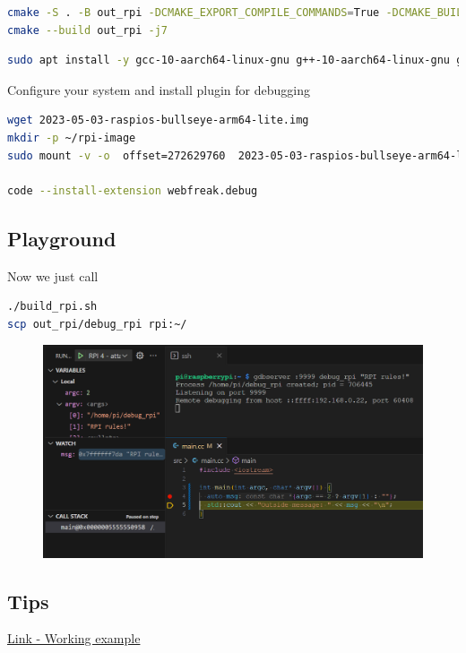 \documentclass[twocolumn, 10pt]{article}
\makeatletter
\newcommand{\fsize}{\f@size pt }
\makeatother
\begin{document}
  
\begin{lstlisting}[language=sh,breaklines=true,caption={build_rpi.sh}]
cmake -S . -B out_rpi -DCMAKE_EXPORT_COMPILE_COMMANDS=True -DCMAKE_BUILD_TYPE=Debug --toolchain rpi4.toolchain.cmake
cmake --build out_rpi -j7
\end{lstlisting}

\begin{lstlisting}[language=sh]
sudo apt install -y gcc-10-aarch64-linux-gnu g++-10-aarch64-linux-gnu gdb-multiarch clangd
\end{lstlisting}

Configure your system and install plugin for debugging
\begin{lstlisting}[language=sh,breaklines=true]
wget 2023-05-03-raspios-bullseye-arm64-lite.img
mkdir -p ~/rpi-image
sudo mount -v -o  offset=272629760  2023-05-03-raspios-bullseye-arm64-lite.img /mnt/d/programming/x-compile-os/rpi4

code --install-extension webfreak.debug
\end{lstlisting}


\subsection{Playground}
Now we just call 
\begin{lstlisting}[language=sh,breaklines=true]
./build_rpi.sh
scp out_rpi/debug_rpi rpi:~/ 
\end{lstlisting}


\begin{figure}
  \includegraphics[width=\linewidth]{res/remote_debug_rpi.png}
  \label{fig:debug}
\end{figure}





\subsection{Tips}


\href{https://github.com/HalfInner/remote_debug_rpi}{Link - Working example} 
\end{document}
